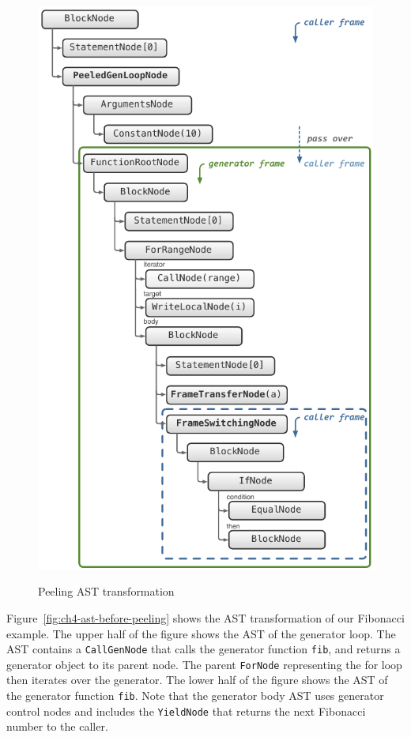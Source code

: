 \begin{figure}
{	\includegraphics[scale=.82]{figures/ch4-peeled-ast}
	\label{fig:ch4-peeled-ast}
}
\caption{Peeling AST transformation}
\label{fig:ch4-ast-transformation}
\end{figure}

Figure~\ref{fig:ch4-ast-before-peeling} shows the AST transformation of our Fibonacci example.
The upper half of the figure shows the AST of the generator loop.
The AST contains a \texttt{CallGenNode} that calls the generator function \texttt{fib}, and returns a generator object to its parent node.
The parent \texttt{ForNode} representing the for loop then iterates over the generator.
The lower half of the figure shows the AST of the generator function \texttt{fib}.
Note that the generator body AST uses generator control nodes and includes the \texttt{YieldNode} that returns the next Fibonacci number to the caller.

